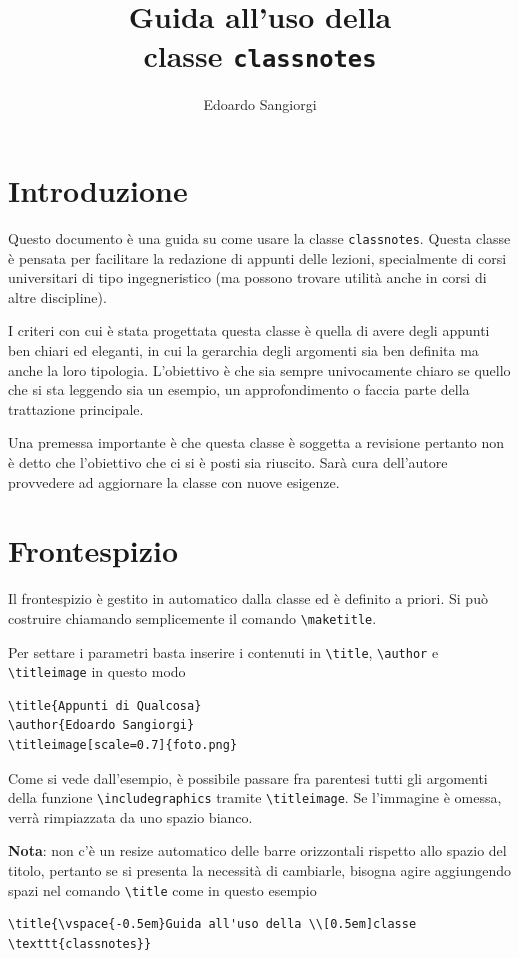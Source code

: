\documentclass{classnotes}
\title{\vspace{-1em}Guida all'uso della \\[0.5em]classe \texttt{classnotes}\vspace{-0.5em}}
\author{Edoardo Sangiorgi}
\def\tbs{\textbackslash}
\begin{document}
\maketitle



\chapter{Introduzione}
Questo documento è una guida su come usare la classe \texttt{classnotes}.
Questa classe è pensata per facilitare la redazione di appunti delle lezioni, specialmente di corsi universitari di tipo ingegneristico (ma possono trovare utilità anche in corsi di altre discipline).

I criteri con cui è stata progettata questa classe è quella di avere degli appunti ben chiari ed eleganti, in cui la gerarchia degli argomenti sia ben definita ma anche la loro tipologia.
L'obiettivo è che sia sempre univocamente chiaro se quello che si sta leggendo sia un esempio, un approfondimento o faccia parte della trattazione principale.

Una premessa importante è che questa classe è soggetta a revisione pertanto non è detto che l'obiettivo che ci si è posti sia riuscito.
Sarà cura dell'autore provvedere ad aggiornare la classe con nuove esigenze.


\chapter{Frontespizio}
Il frontespizio è gestito in automatico dalla classe ed è definito a priori.
Si può costruire chiamando semplicemente il comando \texttt{\tbs maketitle}.

Per settare i parametri basta inserire i contenuti in \texttt{\tbs title}, \texttt{\tbs author} e \texttt{\tbs titleimage} in questo modo

\begin{verbatim}
\title{Appunti di Qualcosa}
\author{Edoardo Sangiorgi}
\titleimage[scale=0.7]{foto.png}
\end{verbatim}

Come si vede dall'esempio, è possibile passare fra parentesi tutti gli argomenti della funzione \texttt{\tbs includegraphics} tramite \texttt{\tbs titleimage}.
Se l'immagine è omessa, verrà rimpiazzata da uno spazio bianco.

\textbf{Nota}: non c'è un resize automatico delle barre orizzontali rispetto allo spazio del titolo, pertanto se si presenta la necessità di cambiarle, bisogna agire aggiungendo spazi nel comando \texttt{\tbs title} come in questo esempio
\begin{verbatim}
\title{\vspace{-0.5em}Guida all'uso della \\[0.5em]classe \texttt{classnotes}} 
\end{verbatim}
\end{document}
